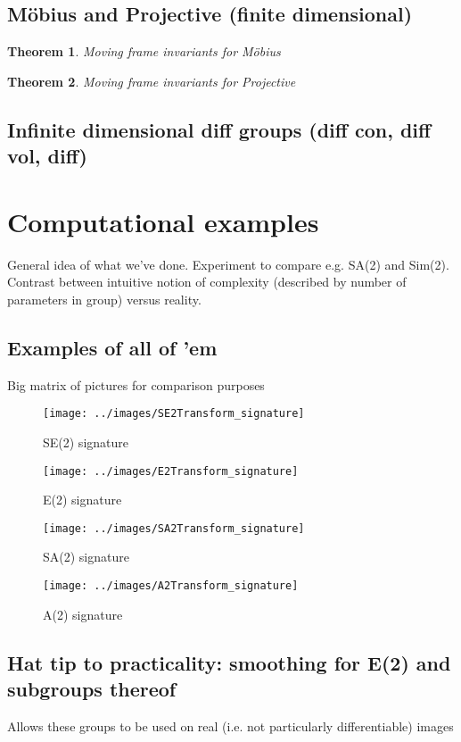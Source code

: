 \documentclass{article}
\newtheorem{theorem}{Theorem}
\begin{document}
\subsection{M\"obius and Projective (finite dimensional)}
\begin{theorem}
  Moving frame invariants for M\"obius
\end{theorem}
\begin{theorem}
  Moving frame invariants for Projective
\end{theorem}

\subsection{Infinite dimensional diff groups (diff con, diff vol, diff)}




\section{Computational examples}
General idea of what we've done. Experiment to compare e.g. SA(2) and
Sim(2). Contrast between intuitive notion of complexity (described by
number of parameters in group) versus reality.

\subsection{Examples of all of 'em}
Big matrix of pictures for comparison purposes

\begin{figure}
	\texttt{[image: ../images/SE2Transform\_signature]}
	\caption{SE(2) signature}
\end{figure}
\begin{figure}
	\texttt{[image: ../images/E2Transform\_signature]}
	\caption{E(2) signature}
\end{figure}
\begin{figure}
	\texttt{[image: ../images/SA2Transform\_signature]}
	\caption{SA(2) signature}
\end{figure}
\begin{figure}
	\texttt{[image: ../images/A2Transform\_signature]}
	\caption{A(2) signature}
\end{figure}

\subsection{Hat tip to practicality: smoothing for E(2) and subgroups thereof}
Allows these groups to be used on real (i.e. not particularly
differentiable) images
\end{document}
